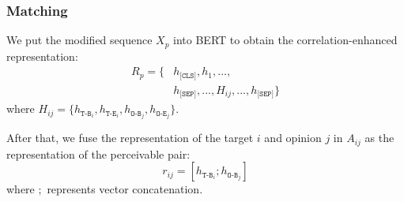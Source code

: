\documentclass[11pt]{article}
\begin{document}
\subsubsection{Matching} 
We put the modified sequence $X_{p}$ into BERT 
to obtain the correlation-enhanced representation:
\begin{equation}
    \begin{aligned}
        R_{p}  = \{& h_\texttt{[CLS]}, h_1, ..., \\ &h_\texttt{[SEP]}, ..., H_{ij}, ..., h_\texttt{[SEP]} \}
    \end{aligned}
\end{equation}
where $H_{ij}  = \{ h_{\texttt{T-B}_{i}}, h_{\texttt{T-E}_{i}}, h_{\texttt{O-B}_{j}}, h_{\texttt{O-E}_{j}} \}$.

After that, we fuse the representation of the target $i$ and opinion $j$ in $A_{ij}$ as the representation of the perceivable pair:
\begin{equation}
    r_{ij} = [h_{\texttt{T-B}_i}; h_{\texttt{O-B}_j}]
\end{equation}
where $;$ represents vector concatenation.
\end{document}
